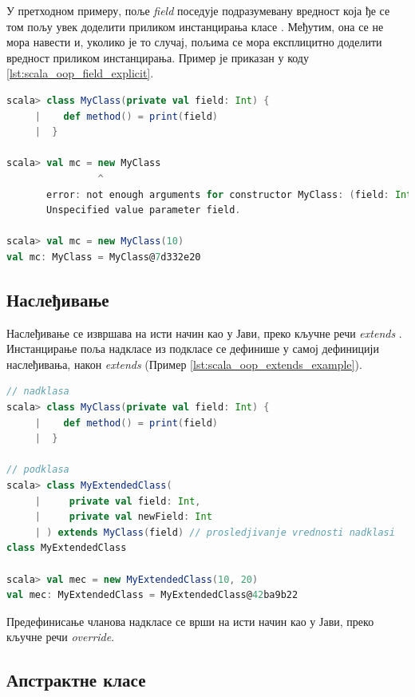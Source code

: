 \documentclass[12pt,oneside]{memoir}
\begin{document}
У претходном примеру, поље \textit{field} поседује подразумевану вредност која ђе се том пољу увек доделити приликом инстанцирања класе \cite{scala_prog}. Међутим, она се не мора навести и, уколико је то случај, пољима се мора експлицитно доделити вредност приликом инстанцирања. Пример је приказан у коду \ref{lst:scala_oop_field_explicit}.

\begin{lstlisting}[language=Scala, caption={Инстанцирање класе без подразумеваних вредности поља}, label={lst:scala_oop_field_explicit}]
scala> class MyClass(private val field: Int) {
     |    def method() = print(field)
     |  }

scala> val mc = new MyClass
                ^
       error: not enough arguments for constructor MyClass: (field: Int): MyClass.
       Unspecified value parameter field.
     
scala> val mc = new MyClass(10)
val mc: MyClass = MyClass@7d332e20
\end{lstlisting}

\subsection{Наслеђивање}
\label{subsec:scala_nasled}

Наслеђивање се извршава на исти начин као у Јави, преко кључне речи \textit{extends} \cite{scala_prog}. Инстанцирање поља надкласе из подкласе се дефинише у самој дефиницији наслеђивања, након \textit{extends} (Пример \ref{lst:scala_oop_extends_example}).

\begin{lstlisting}[language=Scala, caption={Наслеђивање у Скали}, label={lst:scala_oop_extends_example}]
// nadklasa
scala> class MyClass(private val field: Int) {
     |    def method() = print(field)
     |  }

// podklasa
scala> class MyExtendedClass(
     |     private val field: Int,
     |     private val newField: Int
     | ) extends MyClass(field) // prosledjivanje vrednosti nadklasi
class MyExtendedClass

scala> val mec = new MyExtendedClass(10, 20)
val mec: MyExtendedClass = MyExtendedClass@42ba9b22
\end{lstlisting}

Предефинисање чланова надкласе се врши на исти начин као у Јави, преко кључне речи \textit{override}.

\subsection{Апстрактне класе}
\label{subsec:scala_abs}
\end{document}
